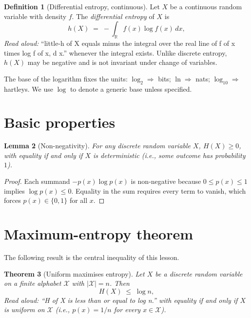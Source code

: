 \documentclass[11pt]{article}
\newtheorem{theorem}{Theorem}
\newtheorem{lemma}[theorem]{Lemma}
\theoremstyle{definition}
\newtheorem{definition}[theorem]{Definition}
\begin{document}
\begin{definition}[Differential entropy, continuous]
Let $X$ be a continuous random variable with density $f$. The \emph{differential entropy}
of $X$ is
\[
h(X) \;=\; -\int_{\mathbb{R}} f(x) \log f(x) \, dx,
\]
\emph{Read aloud:} ``little-h of X equals minus the integral over the real line of f of x times log f of x, d x.''
whenever the integral exists. Unlike discrete entropy, $h(X)$ may be negative and is
not invariant under change of variables.
\end{definition}

The base of the logarithm fixes the units: $\log_2 \Rightarrow$ bits;
$\ln \Rightarrow$ nats; $\log_{10} \Rightarrow$ hartleys. We use $\log$ to denote a
generic base unless specified.

\section{Basic properties}

\begin{lemma}[Non-negativity]
For any discrete random variable $X$, $H(X) \ge 0$, with equality if and only if $X$ is
deterministic (i.e., some outcome has probability $1$).
\end{lemma}

\begin{proof}
Each summand $-p(x) \log p(x)$ is non-negative because $0 \le p(x) \le 1$ implies
$\log p(x) \le 0$. Equality in the sum requires every term to vanish, which forces
$p(x) \in \{0, 1\}$ for all $x$.
\end{proof}

\section{Maximum-entropy theorem}

The following result is the central inequality of this lesson.

\begin{theorem}[Uniform maximises entropy]
\label{thm:max-entropy}
Let $X$ be a discrete random variable on a finite alphabet $\mathcal{X}$ with
$|\mathcal{X}| = n$. Then
\[
H(X) \;\le\; \log n,
\]
\emph{Read aloud:} ``H of X is less than or equal to log n.''
with equality if and only if $X$ is uniform on $\mathcal{X}$ (i.e.,
$p(x) = 1/n$ for every $x \in \mathcal{X}$).
\end{theorem}
\end{document}
